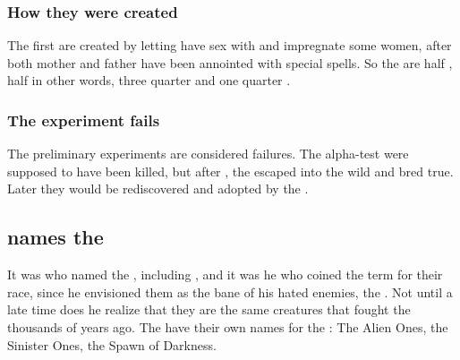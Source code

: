 




\subsubsection{How they were created}
The first \humans{} are created by letting \Thanatzil{} have sex with and impregnate some \nephilic{} women, after both mother and father have been annointed with special spells. 
So the \humans{} are half \nephil, half \resphan\dash in other words, three quarter \nephil{} and one quarter \bane. 





\subsubsection{The experiment fails}
The preliminary \human{} experiments are considered failures. 
The alpha-test \humans{} were supposed to have been killed, but after , the \humans{} escaped into the wild and bred true. 
Later they would be rediscovered and adopted by the \resphain. 









\subsection{\Semiza{} names the \banes}
It was \Semiza{} who named the \banelords, including \Daggerrain, and it was he who coined the term \quo{\bane} for their race, since he envisioned them as the bane of his hated enemies, the \dragons. Not until a late time does he realize that they are the same creatures that fought the \dragons{} thousands of years ago. The \dragons{} have their own names for the \banes: The Alien Ones, the Sinister Ones, the Spawn of Darkness. 









